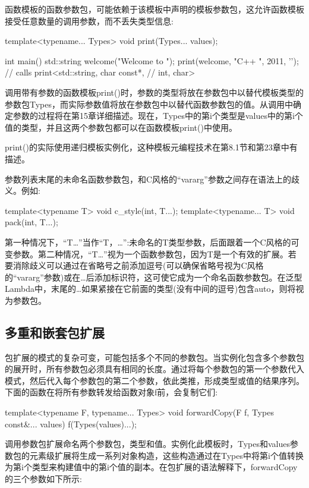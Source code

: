 函数模板的函数参数包，可能依赖于该模板中声明的模板参数包，这允许函数模板接受任意数量的调用参数，而不丢失类型信息:

\begin{cpp}
template<typename... Types>
void print(Types... values);

int main()
{
	std::string welcome("Welcome to ");
	print(welcome, "C++ ", 2011, '\n'); // calls print<std::string, char const*,
} // int, char>
\end{cpp}

调用带有参数的函数模板print()时，参数的类型将放在参数包中以替代模板类型的参数包Types，而实际参数值将放在参数包中以替代函数参数包的值。从调用中确定参数的过程将在第15章详细描述。现在，Types中的第i个类型是values中的第i个值的类型，并且这两个参数包都可以在函数模板print()中使用。

print()的实际使用递归模板实例化，这种模板元编程技术在第8.1节和第23章中有描述。

参数列表末尾的未命名函数参数包，和C风格的“vararg”参数之间存在语法上的歧义。例如:

\begin{cpp}
template<typename T> void c_style(int, T...);
template<typename... T> void pack(int, T...);
\end{cpp}

第一种情况下，“T…”当作“T，…”:未命名的T类型参数，后面跟着一个C风格的可变参数。第二种情况，“T…”视为一个函数参数包，因为T是一个有效的扩展。若要消除歧义可以通过在省略号之前添加逗号(可以确保省略号视为C风格的“vararg”参数)或在…后添加标识符，这可使它成为一个命名函数参数包。在泛型Lambda中，末尾的…如果紧接在它前面的类型(没有中间的逗号)包含auto，则将视为参数包。

\subsection{多重和嵌套包扩展}

包扩展的模式的复杂可变，可能包括多个不同的参数包。当实例化包含多个参数包的展开时，所有参数包必须具有相同的长度。通过将每个参数包的第一个参数代入模式，然后代入每个参数包的第二个参数，依此类推，形成类型或值的结果序列。下面的函数在将所有参数转发给函数对象f前，会复制它们:

\begin{cpp}
template<typename F, typename... Types>
void forwardCopy(F f, Types const&... values) {
	f(Types(values)...);
}
\end{cpp}

调用参数包扩展命名两个参数包，类型和值。实例化此模板时，Types和values参数包的元素级扩展将生成一系列对象构造，这些构造通过在Types中将第i个值转换为第i个类型来构建值中的第i个值的副本。在包扩展的语法解释下，forwardCopy的三个参数如下所示:

